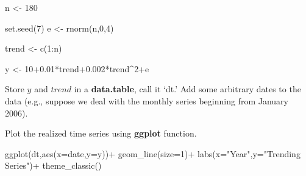 \documentclass[
  12pt,
  oneside]{book}
\newenvironment{Shaded}{\begin{snugshade}}{\end{snugshade}}
\newcommand{\AttributeTok}[1]{\textcolor[rgb]{0.77,0.63,0.00}{#1}}
\newcommand{\DecValTok}[1]{\textcolor[rgb]{0.00,0.00,0.81}{#1}}
\newcommand{\FloatTok}[1]{\textcolor[rgb]{0.00,0.00,0.81}{#1}}
\newcommand{\FunctionTok}[1]{\textcolor[rgb]{0.00,0.00,0.00}{#1}}
\newcommand{\NormalTok}[1]{#1}
\newcommand{\OtherTok}[1]{\textcolor[rgb]{0.56,0.35,0.01}{#1}}
\newcommand{\SpecialCharTok}[1]{\textcolor[rgb]{0.00,0.00,0.00}{#1}}
\newcommand{\StringTok}[1]{\textcolor[rgb]{0.31,0.60,0.02}{#1}}
\begin{document}
\begin{Shaded}
\begin{Highlighting}[]
\NormalTok{n }\OtherTok{\textless{}{-}} \DecValTok{180}

\FunctionTok{set.seed}\NormalTok{(}\DecValTok{7}\NormalTok{)}
\NormalTok{e }\OtherTok{\textless{}{-}} \FunctionTok{rnorm}\NormalTok{(n,}\DecValTok{0}\NormalTok{,}\DecValTok{4}\NormalTok{)}

\NormalTok{trend }\OtherTok{\textless{}{-}} \FunctionTok{c}\NormalTok{(}\DecValTok{1}\SpecialCharTok{:}\NormalTok{n)}

\NormalTok{y }\OtherTok{\textless{}{-}} \DecValTok{10}\FloatTok{+0.01}\SpecialCharTok{*}\NormalTok{trend}\FloatTok{+0.002}\SpecialCharTok{*}\NormalTok{trend}\SpecialCharTok{\^{}}\DecValTok{2}\SpecialCharTok{+}\NormalTok{e}
\end{Highlighting}
\end{Shaded}

Store \(y\) and \(trend\) in a \textbf{data.table}, call it `dt.' Add some arbitrary dates to the data (e.g., suppose we deal with the monthly series beginning from January 2006).

\begin{Shaded}
\end{Shaded}

Plot the realized time series using \textbf{ggplot} function.

\begin{Shaded}
\begin{Highlighting}[]
\FunctionTok{ggplot}\NormalTok{(dt,}\FunctionTok{aes}\NormalTok{(}\AttributeTok{x=}\NormalTok{date,}\AttributeTok{y=}\NormalTok{y))}\SpecialCharTok{+}
  \FunctionTok{geom\_line}\NormalTok{(}\AttributeTok{size=}\DecValTok{1}\NormalTok{)}\SpecialCharTok{+}
  \FunctionTok{labs}\NormalTok{(}\AttributeTok{x=}\StringTok{"Year"}\NormalTok{,}\AttributeTok{y=}\StringTok{"Trending Series"}\NormalTok{)}\SpecialCharTok{+}
  \FunctionTok{theme\_classic}\NormalTok{()}
\end{Highlighting}
\end{Shaded}
\end{document}
